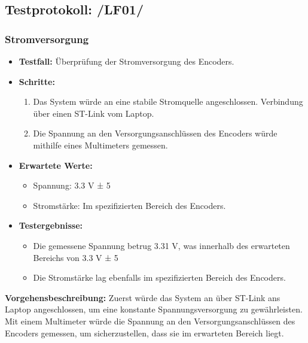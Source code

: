 \subsection{Testprotokoll: /LF01/}

\subsubsection{Stromversorgung}
\begin{itemize}
	\item \textbf{Testfall:} Überprüfung der Stromversorgung des Encoders.
	\item \textbf{Schritte:}
	\begin{enumerate}
		\item Das System würde an eine stabile Stromquelle angeschlossen. Verbindung über einen ST-Link vom Laptop.
		\item Die Spannung an den Versorgungsanschlüssen des Encoders würde mithilfe eines Multimeters gemessen.
	\end{enumerate}
	\item \textbf{Erwartete Werte:}
	\begin{itemize}
		\item Spannung: 3.3 V ± 5%
		\item Stromstärke: Im spezifizierten Bereich des Encoders.
	\end{itemize}
	\item \textbf{Testergebnisse:}
	\begin{itemize}
		\item Die gemessene Spannung betrug 3.31 V, was innerhalb des erwarteten Bereichs von 3.3 V ± 5%
		\item Die Stromstärke lag ebenfalls im spezifizierten Bereich des Encoders.
	\end{itemize}
\end{itemize}

\textbf{Vorgehensbeschreibung:}
Zuerst würde  das System an über ST-Link ans Laptop angeschlossen, um eine konstante Spannungsversorgung zu gewährleisten. Mit einem Multimeter würde die Spannung an den Versorgungsanschlüssen des Encoders gemessen, um sicherzustellen, dass sie im erwarteten Bereich liegt.

